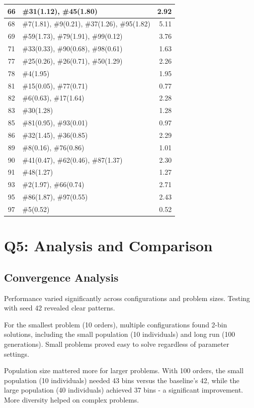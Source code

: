 \documentclass[journal,12pt,onecolumn]{IEEEtran}
\begin{document}
\begin{table}[htbp!]
\begin{tabular}{|c|l|r|}
\hline
66 & \#31(1.12), \#45(1.80) & 2.92 \\
\hline
68 & \#7(1.81), \#9(0.21), \#37(1.26), \#95(1.82) & 5.11 \\
\hline
69 & \#59(1.73), \#79(1.91), \#99(0.12) & 3.76 \\
\hline
71 & \#33(0.33), \#90(0.68), \#98(0.61) & 1.63 \\
\hline
77 & \#25(0.26), \#26(0.71), \#50(1.29) & 2.26 \\
\hline
78 & \#4(1.95) & 1.95 \\
\hline
81 & \#15(0.05), \#77(0.71) & 0.77 \\
\hline
82 & \#6(0.63), \#17(1.64) & 2.28 \\
\hline
83 & \#30(1.28) & 1.28 \\
\hline
85 & \#81(0.95), \#93(0.01) & 0.97 \\
\hline
86 & \#32(1.45), \#36(0.85) & 2.29 \\
\hline
89 & \#8(0.16), \#76(0.86) & 1.01 \\
\hline
90 & \#41(0.47), \#62(0.46), \#87(1.37) & 2.30 \\
\hline
91 & \#48(1.27) & 1.27 \\
\hline
93 & \#2(1.97), \#66(0.74) & 2.71 \\
\hline
95 & \#86(1.87), \#97(0.55) & 2.43 \\
\hline
97 & \#5(0.52) & 0.52 \\
\hline
\end{tabular}
\end{table}

\section{Q5: Analysis and Comparison}

\subsection{Convergence Analysis}

Performance varied significantly across configurations and problem sizes. Testing with seed 42 revealed clear patterns.

For the smallest problem (10 orders), multiple configurations found 2-bin solutions, including the small population (10 individuals) and long run (100 generations). Small problems proved easy to solve regardless of parameter settings.

Population size mattered more for larger problems. With 100 orders, the small population (10 individuals) needed 43 bins versus the baseline's 42, while the large population (40 individuals) achieved 37 bins - a significant improvement. More diversity helped on complex problems.
\end{document}
